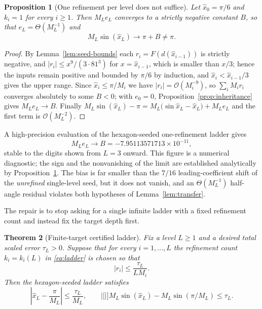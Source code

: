 \documentclass[12pt]{article}
\newtheorem{theorem}{Theorem}[section]
\newtheorem{proposition}[theorem]{Proposition}
\theoremstyle{definition}
\theoremstyle{remark}
\newcommand{\abs}[1]{\left|#1\right|}
\newcommand{\Order}{\mathcal{O}}
\begin{document}
\begin{proposition}[One refinement per level does not suffice]
\label{prop:one-refinement-fails}
Let $\widehat x_0=\pi/6$ and $k_i=1$ for every $i\ge1$.  Then $M_Le_L$ converges
to a strictly negative constant $B$, so that $e_L=\Theta(M_L^{-1})$ and
\[
  M_L\sin(\widehat x_L)\longrightarrow\pi+B\ne\pi.
\]
\end{proposition}

\begin{proof}
By Lemma~\ref{lem:seed-bounds} each $r_i=F(d(\widehat x_{i-1}))$ is strictly
negative, and $\abs{r_i}\le x^9/(3\cdot81^3)$ for $x=\widehat x_{i-1}$, which is
smaller than $x/3$; hence the inputs remain positive and bounded by $\pi/6$ by
induction, and $\widehat x_i<\widehat x_{i-1}/3$ gives the upper range.  Since
$\widehat x_i\le\pi/M_i$ we have $\abs{r_i}=\Order(M_i^{-9})$, so
$\sum_iM_ir_i$ converges absolutely to some $B<0$; with $e_0=0$,
Proposition~\ref{prop:inheritance} gives $M_Le_L\to B$.  Finally
$M_L\sin(\widehat x_L)-\pi=M_L\bigl(\sin\widehat x_L-\widehat x_L\bigr)+M_Le_L$
and the first term is $\Order(M_L^{-2})$.
\end{proof}

A high-precision evaluation of the hexagon-seeded one-refinement ladder gives
\[
  M_Le_L\longrightarrow B=-7.95113571713\times10^{-11},
\]
stable to the digits shown from $L=3$ onward.  This figure is a numerical
diagnostic; the sign and the nonvanishing of the limit are established
analytically by Proposition~\ref{prop:one-refinement-fails}.  The bias is far
smaller than the $7/16$ leading-coefficient shift of the \emph{unrefined}
single-level seed, but it does not vanish, and an $\Theta(M_L^{-1})$ half-angle
residual violates both hypotheses of Lemma~\ref{lem:transfer}.

The repair is to stop asking for a single infinite ladder with a fixed
refinement count and instead fix the target depth first.

\begin{theorem}[Finite-target certified ladder]
\label{thm:finite-target}
Fix a level $L\ge1$ and a desired total scaled error $\tau_L>0$.  Suppose that
for every $i=1,\ldots,L$ the refinement count $k_i=k_i(L)$ in \eqref{eq:ladder}
is chosen so that
\begin{equation}
  \abs{r_i}\le\frac{\tau_L}{LM_i}.
  \label{eq:budget}
\end{equation}
Then the hexagon-seeded ladder satisfies
\begin{equation}
  \abs{\widehat x_L-\frac{\pi}{M_L}}\le\frac{\tau_L}{M_L},
  \qquad
  \abs[\big]{M_L\sin(\widehat x_L)-M_L\sin(\pi/M_L)}\le\tau_L.
  \label{eq:finite-target}
\end{equation}
\end{theorem}
\end{document}
